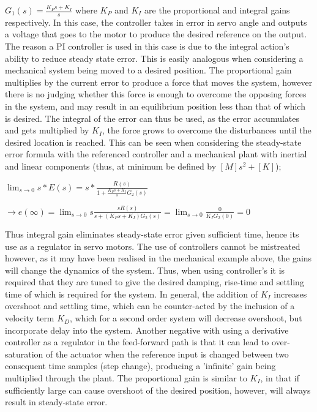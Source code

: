 \documentclass[12pt,openany,a4paper]{book}
\begin{document}
$ G_1 (s) = \frac{K_P s + K_I}{s}$
where $K_P$ and $K_I$ are the proportional and integral gains respectively. In this case, the controller takes in error in servo angle and outputs a voltage that goes to the motor to produce the desired reference on the output. The reason a PI controller is used in this case is due to the integral action's ability to reduce steady state error. This is easily analogous when considering a mechanical system being moved to a desired position. The proportional gain multiplies by the current error to produce a force that moves the system, however there is no judging whether this force is enough to overcome the opposing forces in the system, and may result in an equilibrium position less than that of which is desired. The integral of the error can thus be used, as the error accumulates and gets multiplied by $K_I$, the force grows to overcome the disturbances until the desired location is reached. This can be seen when considering the steady-state error formula with the referenced controller and a mechanical plant with inertial and linear components (thus, at minimum be defined by $[M]s^2 + [K]$);

$ \lim_{s\to0} s * E(s) = s * \frac{R(s)}{1 + \frac{K_P s + K_I}{s} G_2(s)}$

$ \rightarrow e(\infty) = \lim_{s\to0} s   \frac{s   R(s)}{s + (K_P s + K_I) G_2(s)} = \lim_{s\to0} \frac{0}{K_I G_2 (0)} = 0$

Thus integral gain eliminates steady-state error given sufficient time, hence its use as a regulator in servo motors. The use of controllers cannot be mistreated however, as it may have been realised in the mechanical example above, the gains will change the dynamics of the system. Thus, when using controller's it is required that they are tuned to give the desired damping, rise-time and settling time of which is required for the system. In general, the addition of $K_I$ increases overshoot and settling time, which can be counter-acted by the inclusion of a velocity term $K_D$, which for a second order system will decrease overshoot, but incorporate delay into the system. Another negative with using a derivative controller as a regulator in the feed-forward path is that it can lead to over-saturation of the actuator when the reference input is changed between two consequent time samples (step change), producing a 'infinite' gain being multiplied through the plant. The proportional gain is similar to $K_I$, in that if sufficiently large can cause overshoot of the desired position, however, will always result in steady-state error.
\end{document}
